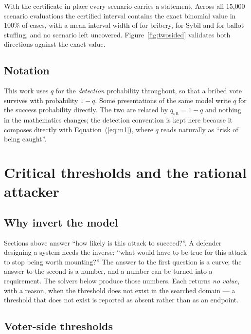 \documentclass[11pt,a4paper]{article}
\newcommand{\eqnref}[1]{Equation~(\ref{#1})}
\begin{document}
With the certificate in place every scenario carries a statement. Across
all 15{,}000 scenario evaluations the certified interval contains the
exact binomial value in 100\% of cases, with a mean interval width of
\BriberyIntervalWidth{} for bribery, \SybilIntervalWidth{} for Sybil and
\BallotStuffingIntervalWidth{} for ballot stuffing, and no scenario left
uncovered. Figure~\ref{fig:twosided} validates both directions
against the exact value.

\subsection{Notation}

This work uses $q$ for the \emph{detection} probability throughout, so that a bribed
vote survives with probability $1-q$. Some presentations of the same model write $q$ for
the success probability directly. The two are related by $q_{\text{alt}} = 1 - q$ and
nothing in the mathematics changes; the detection convention is kept here because it
composes directly with \eqnref{eq:m1}, where $q$ reads naturally as ``risk of being
caught''.

\section{Critical thresholds and the rational attacker}
\label{sec:thresholds}

\subsection{Why invert the model}

Sections above answer ``how likely is this attack to succeed?''. A defender designing a
system needs the inverse: ``what would have to be true for this attack to stop being
worth mounting?'' The answer to the first question is a curve; the answer to the second
is a number, and a number can be turned into a requirement. The solvers below produce
those numbers. Each returns \emph{no value}, with a reason, when the threshold does not
exist in the searched domain --- a threshold that does not exist is reported as absent
rather than as an endpoint.

\subsection{Voter-side thresholds}
\end{document}
